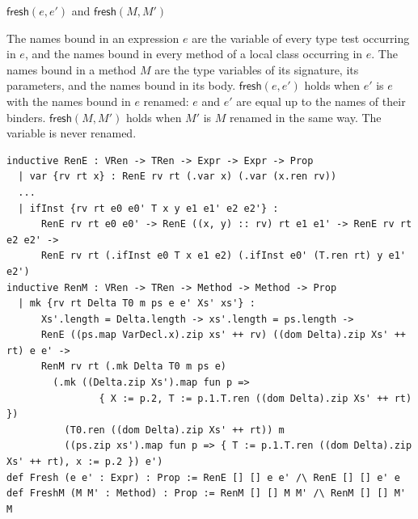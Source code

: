 \begin{cmp}{$\mathsf{fresh}(e,e')$ and $\mathsf{fresh}(M,M')$}
\begin{paperside}
The names bound in an expression $e$ are the variable of every type test occurring in $e$, and the names bound in every method of a local class occurring in $e$.
The names bound in a method $M$ are the type variables of its signature, its parameters, and the names bound in its body.
$\mathsf{fresh}(e,e')$ holds when $e'$ is $e$ with the names bound in $e$ renamed: $e$ and $e'$ are equal up to the names of their binders.
$\mathsf{fresh}(M,M')$ holds when $M'$ is $M$ renamed in the same way.
The variable \Q@this@ is never renamed.
\end{paperside}
\begin{leanside}
\begin{lstlisting}[style=leanside]
inductive RenE : VRen -> TRen -> Expr -> Expr -> Prop
  | var {rv rt x} : RenE rv rt (.var x) (.var (x.ren rv))
  ...
  | ifInst {rv rt e0 e0' T x y e1 e1' e2 e2'} :
      RenE rv rt e0 e0' -> RenE ((x, y) :: rv) rt e1 e1' -> RenE rv rt e2 e2' ->
      RenE rv rt (.ifInst e0 T x e1 e2) (.ifInst e0' (T.ren rt) y e1' e2')
inductive RenM : VRen -> TRen -> Method -> Method -> Prop
  | mk {rv rt Delta T0 m ps e e' Xs' xs'} :
      Xs'.length = Delta.length -> xs'.length = ps.length ->
      RenE ((ps.map VarDecl.x).zip xs' ++ rv) ((dom Delta).zip Xs' ++ rt) e e' ->
      RenM rv rt (.mk Delta T0 m ps e)
        (.mk ((Delta.zip Xs').map fun p =>
                { X := p.2, T := p.1.T.ren ((dom Delta).zip Xs' ++ rt) })
          (T0.ren ((dom Delta).zip Xs' ++ rt)) m
          ((ps.zip xs').map fun p => { T := p.1.T.ren ((dom Delta).zip Xs' ++ rt), x := p.2 }) e')
def Fresh (e e' : Expr) : Prop := RenE [] [] e e' /\ RenE [] [] e' e
def FreshM (M M' : Method) : Prop := RenM [] [] M M' /\ RenM [] [] M' M
\end{lstlisting}
\end{leanside}
\end{cmp}


